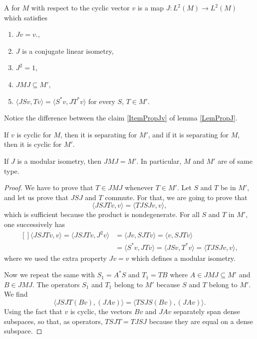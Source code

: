 \begin{definition}
	A  for $M$ with respect to the cyclic vector $v$ is a map $J\colon L^2(M)\to L^2(M)$ which satisfies 
	\begin{enumerate}
		\item $Jv=v$.,
		\item $J$ is a conjugate linear isometry,
		\item $J^2=1$,
		\item $JMJ\subseteq M'$,
		\item $\langle JSv, Tv\rangle =\langle S^*v, JT^*v\rangle $ for every $S$, $T\in M'$.
	\end{enumerate}
	Notice the difference between the claim \ref{ItemPropJv} of lemma \ref{LemPropJ}.
\end{definition}

\begin{lemma}
	If $v$ is cyclic for $M$, then it is separating for $M'$, and if it is separating for $M$, then it is cyclic for $M'$.
\end{lemma}


\begin{proposition}
	If $J$ is a modular isometry, then $JMJ=M'$. In particular, $M$ and $M'$ are of same type.
\end{proposition}

\begin{proof}
	We have to prove that $T\in JMJ$ whenever $T\in M'$. Let $S$ and $T$ be in $M'$, and let us prove that $JSJ$ and $T$ commute. For that, we are going to prove that
	\begin{equation}
		\langle JSJTv, v\rangle =\langle TJSJv, v\rangle,
	\end{equation}
	which is sufficient because the product is nondegenerate. For all $S$ and $T$ in $M'$, one successively has
	\begin{equation}
	\begin{aligned}[]
		\langle JSJTv, v\rangle =\langle JSJTv, J^2v\rangle	&=\langle Jv, SJTv\rangle =\langle v, SJTv\rangle\\
									& =\langle S^*v, JTv\rangle =\langle JSv, T^*v\rangle=\langle TJSJv, v\rangle,
	\end{aligned}
\end{equation}
	where we used the extra property $Jv=v$ which defines a modular isometry.

	Now we repeat the same with $S_1=A^*S$ and $T_1=TB$ where $A\in JMJ\subseteq M'$ and $B\in JMJ$. The operators $S_1$ and $T_1$ belong to $M'$ because $S$ and $T$ belong to $M'$. We find
	\begin{equation}
		\langle JSJT(Bv), (JAv)\rangle =\langle TSJS(Bv), (JAv)\rangle.
	\end{equation}
	Using the fact that $v$ is cyclic, the vectors $Bv$ and $JAv$ separately span dense subspaces, so that, as operators, $TSJT=TJSJ$ because they are equal on a dense subspace.
\end{proof}


